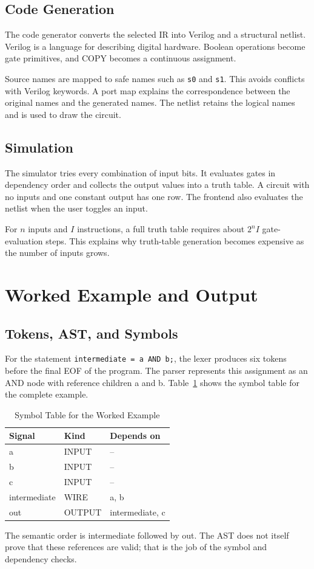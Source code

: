 \documentclass[conference]{IEEEtran}
\newcommand{\code}[1]{\texttt{#1}}
\begin{document}
\subsection{Code Generation}
The code generator converts the selected IR into Verilog and a structural netlist. Verilog is a language for describing digital hardware. Boolean operations become gate primitives, and COPY becomes a continuous assignment.

Source names are mapped to safe names such as \code{s0} and \code{s1}. This avoids conflicts with Verilog keywords. A port map explains the correspondence between the original names and the generated names. The netlist retains the logical names and is used to draw the circuit.

\subsection{Simulation}
The simulator tries every combination of input bits. It evaluates gates in dependency order and collects the output values into a truth table. A circuit with no inputs and one constant output has one row. The frontend also evaluates the netlist when the user toggles an input.

For $n$ inputs and $I$ instructions, a full truth table requires about $2^n I$ gate-evaluation steps. This explains why truth-table generation becomes expensive as the number of inputs grows.

\section{Worked Example and Output}
\subsection{Tokens, AST, and Symbols}
For the statement \code{intermediate = a AND b;}, the lexer produces six tokens before the final EOF of the program. The parser represents this assignment as an AND node with reference children a and b. Table~\ref{tab:symbols} shows the symbol table for the complete example.
\begin{table}[ht]
\caption{Symbol Table for the Worked Example}
\label{tab:symbols}
\centering\small
\begin{tabular}{lll}
\toprule Signal & Kind & Depends on\\\midrule
a & INPUT & --\\b & INPUT & --\\c & INPUT & --\\
intermediate & WIRE & a, b\\out & OUTPUT & intermediate, c\\\bottomrule
\end{tabular}
\end{table}
The semantic order is intermediate followed by out. The AST does not itself prove that these references are valid; that is the job of the symbol and dependency checks.
\end{document}
